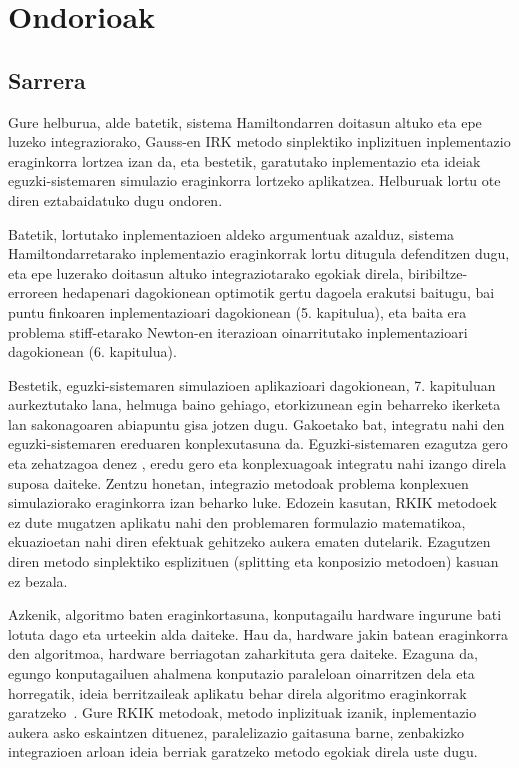 \chapter{Ondorioak}

\section*{Sarrera}

Gure helburua, alde batetik, sistema Hamiltondarren doitasun altuko eta epe luzeko integraziorako, Gauss-en IRK metodo sinplektiko inplizituen inplementazio eraginkorra lortzea izan da, eta bestetik, garatutako inplementazio eta ideiak eguzki-sistemaren simulazio eraginkorra lortzeko aplikatzea. Helburuak lortu ote diren eztabaidatuko dugu ondoren.

Batetik, lortutako inplementazioen aldeko argumentuak azalduz, sistema Hamiltondarretarako inplementazio eraginkorrak lortu ditugula defenditzen dugu, eta epe luzerako doitasun altuko integraziotarako egokiak direla, biribiltze-erroreen hedapenari dagokionean optimotik gertu dagoela erakutsi baitugu, bai puntu finkoaren inplementazioari dagokionean (5. kapitulua), eta baita era problema stiff-etarako Newton-en iterazioan oinarritutako inplementazioari dagokionean (6. kapitulua).

Bestetik, eguzki-sistemaren simulazioen aplikazioari dagokionean, 7. kapituluan aurkeztutako lana, helmuga baino gehiago, etorkizunean egin beharreko ikerketa lan sakonagoaren abiapuntu gisa jotzen dugu.  Gakoetako bat, integratu nahi den eguzki-sistemaren ereduaren konplexutasuna da. Eguzki-sistemaren ezagutza gero eta zehatzagoa denez \cite{Kaplan2015}, eredu gero eta konplexuagoak integratu nahi izango direla suposa daiteke. Zentzu honetan, integrazio metodoak problema konplexuen simulaziorako eraginkorra izan beharko luke. Edozein kasutan, RKIK metodoek ez dute mugatzen aplikatu nahi den problemaren formulazio matematikoa,  ekuazioetan nahi diren efektuak gehitzeko aukera ematen dutelarik. Ezagutzen diren metodo sinplektiko esplizituen (splitting eta konposizio metodoen) kasuan ez bezala.

Azkenik, algoritmo baten eraginkortasuna, konputagailu hardware ingurune bati lotuta dago eta urteekin alda daiteke. Hau da,   hardware jakin batean eraginkorra den algoritmoa, hardware berriagotan zaharkituta gera daiteke.  Ezaguna da, egungo konputagailuen ahalmena konputazio paraleloan oinarritzen dela eta horregatik, ideia berritzaileak aplikatu behar direla algoritmo eraginkorrak garatzeko~\cite{Dongarra2017}. Gure RKIK metodoak, metodo inplizituak izanik, inplementazio aukera asko eskaintzen dituenez, paralelizazio gaitasuna barne, zenbakizko integrazioen arloan ideia berriak garatzeko metodo egokiak direla uste dugu.


